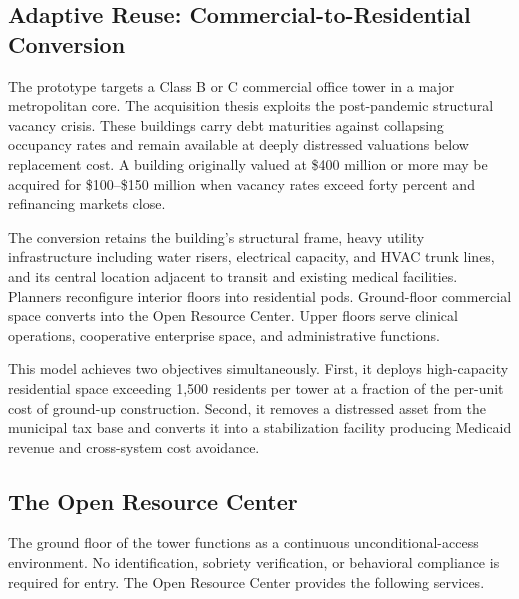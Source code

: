 \documentclass[12pt, letterpaper]{article}
\begin{document}
\subsection{Adaptive Reuse: Commercial-to-Residential Conversion}

The prototype targets a Class B or C commercial office tower in a major metropolitan core. The acquisition thesis exploits the post-pandemic structural vacancy crisis. These buildings carry debt maturities against collapsing occupancy rates and remain available at deeply distressed valuations below replacement cost. A building originally valued at \$400 million or more may be acquired for \$100--\$150 million when vacancy rates exceed forty percent and refinancing markets close.

The conversion retains the building's structural frame, heavy utility infrastructure including water risers, electrical capacity, and HVAC trunk lines, and its central location adjacent to transit and existing medical facilities. Planners reconfigure interior floors into residential pods. Ground-floor commercial space converts into the Open Resource Center. Upper floors serve clinical operations, cooperative enterprise space, and administrative functions.

This model achieves two objectives simultaneously. First, it deploys high-capacity residential space exceeding 1,500 residents per tower at a fraction of the per-unit cost of ground-up construction. Second, it removes a distressed asset from the municipal tax base and converts it into a stabilization facility producing Medicaid revenue and cross-system cost avoidance.

\subsection{The Open Resource Center}

The ground floor of the tower functions as a continuous unconditional-access environment. No identification, sobriety verification, or behavioral compliance is required for entry. The Open Resource Center provides the following services.
\end{document}
